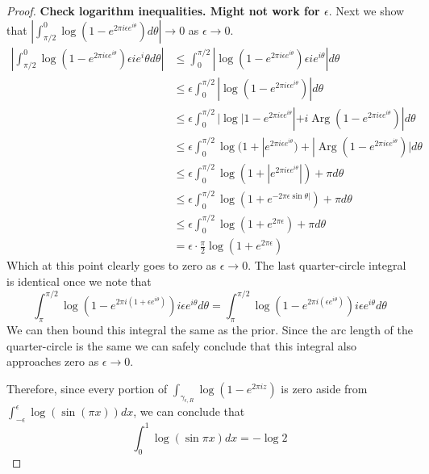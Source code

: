 \documentclass[10pt]{article}
\DeclareMathOperator{\Arg}{Arg}
\theoremstyle{remark}
\theoremstyle{remark}
\begin{document}
\begin{proof}
  \textbf{Check logarithm inequalities. Might not work for $\epsilon$}.
  Next we show that $|\int_{\pi/2}^0\log(1-e^{2\pi i \epsilon e^{i\theta}}) d\theta|\rightarrow 0$ as $\epsilon\rightarrow 0$.
  \begin{align*}
    |\int_{\pi/2}^0\log(1-e^{2\pi i \epsilon e^{i\theta}}) \epsilon ie^i\theta d\theta| &\leq \int_0^{\pi/2}|\log(1-e^{2\pi i \epsilon e^{i\theta}})\epsilon ie^{i\theta}|d\theta\\
                                                       &\leq\epsilon\int_0^{\pi/2}|\log(1-e^{2\pi i \epsilon e^{i\theta}})|d\theta\\
                                           &\leq \epsilon\int_0^{\pi/2}|\log|1-e^{2\pi i \epsilon e^{i\theta}}|+i\Arg(1-e^{2\pi i \epsilon e^{i\theta}})|d\theta\\
                                                       &\leq \epsilon\int_0^{\pi/2}\log(1+|e^{2\pi i\epsilon e^{i\theta}})+|\Arg(1-e^{2\pi i \epsilon e^{i\theta}})|d\theta\\
                                                       &\leq\epsilon\int_0^{\pi/2}\log(1+|e^{2\pi i\epsilon e^{i\theta}}|)+\pi d\theta\\
                                                       &\leq\epsilon\int_0^{\pi/2}\log(1+e^{-2\pi \epsilon\sin\theta|})+\pi d\theta\\
                                                       &\leq\epsilon\int_0^{\pi/2}\log(1+e^{2\pi \epsilon})+\pi d\theta\\
                                                       &= \epsilon\cdot\frac{\pi}{2}\log(1+e^{2\pi\epsilon})
  \end{align*}
  Which at this point clearly goes to zero as $\epsilon\rightarrow 0$. The last quarter-circle integral is identical
  once we note that
  \[
    \int_{\pi}^{\pi/2}\log(1-e^{2\pi i(1+\epsilon e^{i\theta})})i\epsilon e^{i\theta}d\theta =  \int_{\pi}^{\pi/2}\log(1-e^{2\pi i(\epsilon e^{i\theta})})i\epsilon e^{i\theta}d\theta
  \]
  We can then bound this integral the same as the prior. Since the arc length of the quarter-circle
  is the same we can safely conclude that this integral also approaches zero as $\epsilon\rightarrow 0$.

  Therefore, since every portion of $\int_{\gamma_{\epsilon,R}}\log(1-e^{2\pi i z})$ is zero aside from
  $\int_{-\epsilon}^\epsilon\log(\sin(\pi x))dx$, we can conclude that
  \[
    \int_0^1\log(\sin\pi x)dx = -\log 2
  \]
\end{proof}
\end{document}
